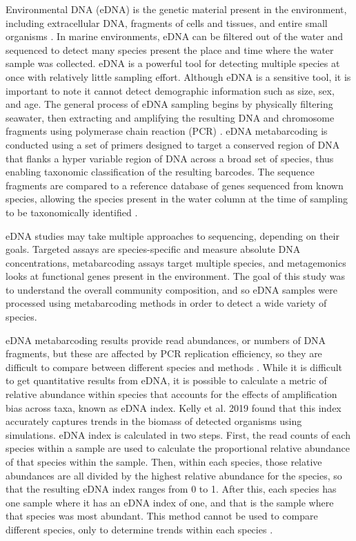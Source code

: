\documentclass[12pt,twoside]{reedthesis}
\begin{document}
Environmental DNA (eDNA) is the genetic material present in the environment, including extracellular DNA, fragments of cells and tissues, and entire small organisms \autocite{Taberlet2018}. In marine environments, eDNA can be filtered out of the water and sequenced to detect many species present the place and time where the water sample was collected. eDNA is a powerful tool for detecting multiple species at once with relatively little sampling effort. Although eDNA is a sensitive tool, it is important to note it cannot detect demographic information such as size, sex, and age. The general process of eDNA sampling begins by physically filtering seawater, then extracting and amplifying the resulting DNA and chromosome fragments using polymerase chain reaction (PCR) \autocite{Power2023}. eDNA metabarcoding is conducted using a set of  primers designed to target a conserved region of DNA that flanks a hyper variable region of DNA across a broad set of species, thus enabling taxonomic classification of the resulting barcodes. The sequence fragments are compared to a reference database of genes sequenced from known species, allowing the species present in the water column at the time of sampling to be taxonomically identified \autocite{Miya2022}.

eDNA studies may take multiple approaches to sequencing, depending on their goals. Targeted assays are species-specific and measure absolute DNA concentrations, metabarcoding assays target multiple species, and metagemonics looks at functional genes present in the environment. The goal of this study was to understand the overall community composition, and so eDNA samples were processed using metabarcoding methods in order to detect a wide variety of species.

eDNA metabarcoding results provide read abundances, or numbers of DNA fragments, but these are affected by PCR replication efficiency, so they are difficult to compare between different species and methods \autocite{Miya2022}. While it is difficult to get quantitative results from eDNA, it is possible to calculate a metric of relative abundance within species that accounts for the effects of amplification bias across taxa, known as eDNA index. Kelly et al. 2019 found that this index accurately captures trends in the biomass of detected organisms using simulations. eDNA index is calculated in two steps. First, the read counts of each species within a sample are used to calculate the proportional relative abundance of that species within the sample. Then, within each species, those relative abundances are all divided by the highest relative abundance for the species, so that the resulting eDNA index ranges from 0 to 1. After this, each species has one sample where it has an eDNA index of one, and that is the sample where that species was most abundant. This method cannot be used to compare different species, only to determine trends within each species \autocite{Kelly2019}.
\end{document}
